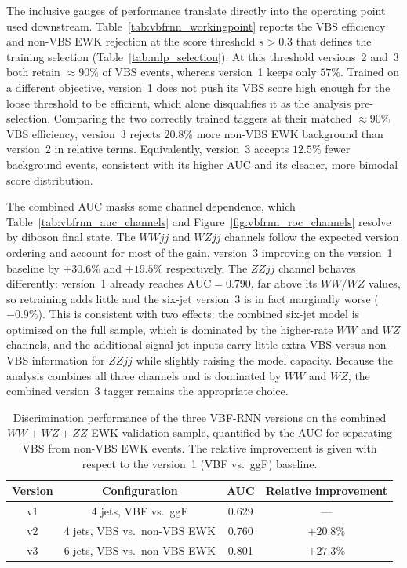 The inclusive gauges of performance translate directly into the operating point used downstream. Table~\ref{tab:vbfrnn_workingpoint} reports the VBS efficiency and non-VBS EWK rejection at the score threshold $s>0.3$ that defines the training selection (Table~\ref{tab:mlp_selection}). At this threshold versions~2 and~3 both retain $\approx\!90\%$ of VBS events, whereas version~1 keeps only $57\%$. Trained on a different objective, version~1 does not push its VBS score high enough for the loose threshold to be efficient, which alone disqualifies it as the analysis pre-selection. Comparing the two correctly trained taggers at their matched $\approx\!90\%$ VBS efficiency, version~3 rejects $20.8\%$ more non-VBS EWK background than version~2 in relative terms. Equivalently, version~3 accepts $12.5\%$ fewer background events, consistent with its higher AUC and its cleaner, more bimodal score distribution.

The combined AUC masks some channel dependence, which Table~\ref{tab:vbfrnn_auc_channels} and Figure~\ref{fig:vbfrnn_roc_channels} resolve by diboson final state. The $WWjj$ and $WZjj$ channels follow the expected version ordering and account for most of the gain, version~3 improving on the version~1 baseline by $+30.6\%$ and $+19.5\%$ respectively. The $ZZjj$ channel behaves differently: version~1 already reaches $\mathrm{AUC}=0.790$, far above its $WW/WZ$ values, so retraining adds little and the six-jet version~3 is in fact marginally worse ($-0.9\%$). This is consistent with two effects: the combined six-jet model is optimised on the full sample, which is dominated by the higher-rate $WW$ and $WZ$ channels, and the additional signal-jet inputs carry little extra VBS-versus-non-VBS information for $ZZjj$ while slightly raising the model capacity. Because the analysis combines all three channels and is dominated by $WW$ and $WZ$, the combined version~3 tagger remains the appropriate choice.

\begin{table}[htbp]
  \centering
  \caption{Discrimination performance of the three VBF-RNN versions on the combined $WW+WZ+ZZ$ EWK validation sample, quantified by the AUC for separating VBS from non-VBS EWK events. The relative improvement is given with respect to the version~1 (VBF vs.\ ggF) baseline.}
  \label{tab:vbfrnn_auc}
  \begin{tabular}{|c|c|c|c|}
    \hline
    \textbf{Version} & \textbf{Configuration} & \textbf{AUC} & \textbf{Relative improvement} \\
    \hline
    v1 & 4 jets, VBF vs.\ ggF         & 0.629 & --- \\
    v2 & 4 jets, VBS vs.\ non-VBS EWK & 0.760 & $+20.8\%$ \\
    v3 & 6 jets, VBS vs.\ non-VBS EWK & 0.801 & $+27.3\%$ \\
    \hline
  \end{tabular}
\end{table}

